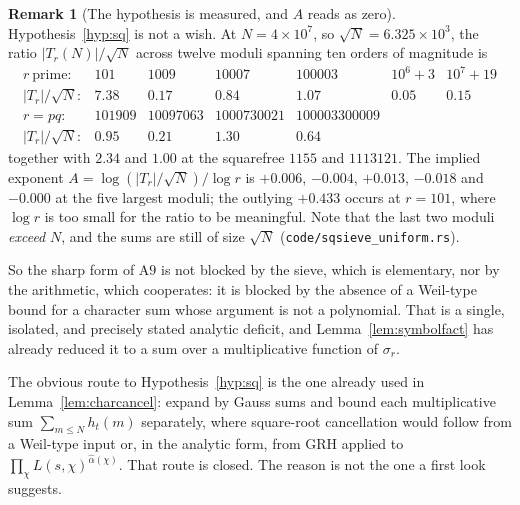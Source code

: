 \documentclass[11pt]{article}
\theoremstyle{definition}
\newtheorem{remark}[theorem]{Remark}
\begin{document}
\begin{remark}[The hypothesis is measured, and $A$ reads as zero]\label{rem:Ameasured}
Hypothesis~\ref{hyp:sq} is not a wish. At $N=4\times10^7$, so $\sqrt N=6.325\times10^3$, the ratio
$|T_r(N)|/\sqrt N$ across twelve moduli spanning ten orders of magnitude is
\[
\begin{array}{lrrrrrr}
r\ \text{prime}: & 101 & 1009 & 10007 & 100003 & 10^6{+}3 & 10^7{+}19\\
|T_r|/\sqrt N:   & 7.38 & 0.17 & 0.84 & 1.07 & 0.05 & 0.15\\[2pt]
r=pq:            & 101909 & 10097063 & 1000730021 & 100003300009 & & \\
|T_r|/\sqrt N:   & 0.95 & 0.21 & 1.30 & 0.64 & &
\end{array}
\]
together with $2.34$ and $1.00$ at the squarefree $1155$ and $1113121$. The implied exponent
$A=\log(|T_r|/\sqrt N)/\log r$ is $+0.006$, $-0.004$, $+0.013$, $-0.018$ and $-0.000$ at the five
largest moduli; the outlying $+0.433$ occurs at $r=101$, where $\log r$ is too small for the ratio to
be meaningful. Note that the last two moduli \emph{exceed} $N$, and the sums are still of size
$\sqrt N$ \textup{(\texttt{code/sqsieve\_uniform.rs})}.

So the sharp form of $\mathrm{A}9$ is not blocked by the sieve, which is elementary, nor by the
arithmetic, which cooperates: it is blocked by the absence of a Weil-type bound for a character sum
whose argument is not a polynomial. That is a single, isolated, and precisely stated analytic
deficit, and Lemma~\ref{lem:symbolfact} has already reduced it to a sum over a multiplicative
function of $\sigma_r$.
\end{remark}

The obvious route to Hypothesis~\ref{hyp:sq} is the one already used in
Lemma~\ref{lem:charcancel}: expand by Gauss sums and bound each multiplicative sum
$\sum_{m\le N}h_t(m)$ separately, where square-root cancellation would follow from a Weil-type
input or, in the analytic form, from \textup{GRH} applied to
$\prod_\chi L(s,\chi)^{\widehat\alpha(\chi)}$. That route is closed. The reason is not the one a first look suggests.
\end{document}
